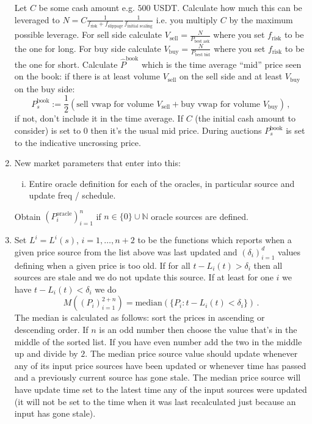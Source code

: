 \documentclass[10pt]{article}
\begin{document}
\begin{enumerate}
Let $C$ be some cash amount e.g. $500$ USDT. 
Calculate how much this can be leveraged to $N = C\frac{1}{f_{\text{risk}} + f_{\text{slippage}}} \frac{1}{f_{\text{initial scaling}}}$ i.e. you multiply $C$ by the maximum possible leverage.
For sell side calculate $V_{\text{sell}} = \frac{N}{P_{\text{best ask}}}$ where you set $f_{\text{risk}}$ to be the one for long. 
For buy side calculate $V_{\text{buy}} = \frac{N}{P_{\text{best bid}}}$ where you set $f_{\text{risk}}$ to be the one for short. 
Calculate $\hat P^{\text{book}}$ which is the time average ``mid'' price seen on the book: if there is at least volume $V_{\text{sell}}$ on the sell side and at least $V_{\text{buy}}$ on the buy side:
\[
P^{\text{book}}_s :=
\frac12 \left(\text{sell vwap for volume $V_{\text{sell}}$}+\text{buy vwap for volume $V_{\text{buy}}$}\right)\,,
\]
if not, don't include it in the time average. 
If $C$ (the initial cash amount to consider) is set to $0$ then it's the usual mid price.
During auctions $P^{\text{book}}_s$ is set to the indicative uncrossing price.

\item 
New market parameters that enter into this:
\begin{enumerate}[i)]
\item Entire oracle definition for each of the oracles, in particular source and update freq / schedule. 
\end{enumerate}

Obtain $(P^{\text{oracle}}_i)_{i=1}^n$ if $n \in \{0\}\cup \mathbb N$ oracle sources are defined.
\item Set $L^{i}=L^{i}(s)$, $i=1,\ldots,n+2$ to be the functions which reports when a given price source from the list above was last updated and $(\delta_i)_{i=1}^d$ values defining when a given price is too old. 
If for all $t-L_i(t) > \delta_i$ then all sources are stale and we do not update this source. 
If at least for one $i$ we have $t-L_i(t) < \delta_i$ we do 
\[
M((P_i)_{i=1}^{2+n}) = \text{median}(\{P_i : t-L_i(t) < \delta_i\}) \,.
\]
The median is calculated as follows: sort the prices in ascending or descending order. If $n$ is an odd number then choose the value that's in the middle of the sorted list. If you have even number add the two in the middle up and divide by $2$.
The median price source value should update whenever any of its input price sources have been updated or whenever time has passed and a previously current source has gone stale.
The median price source will have update time set to the latest time any of the input sources were updated (it will not be set to the time when it was last recalculated just because an input has gone stale).
\end{enumerate}
\end{document}
